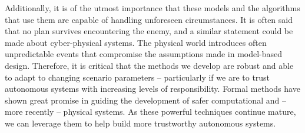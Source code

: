 \documentclass[]{letter}
\begin{document}
Additionally, it is of the utmost importance that these models and the algorithms that use them are capable of handling unforeseen circumstances. It is often said that no plan survives encountering the enemy, and a similar statement could be made about cyber-physical systems. The physical world introduces often unpredictable events that compromise the assumptions made in model-based design. Therefore, it is critical that the methods we develop are robust and able to adapt to changing scenario parameters -- particularly if we are to trust autonomous systems with increasing levels of responsibility. Formal methods have shown great promise in guiding the development of safer computational and -- more recently -- physical systems. As these powerful techniques continue mature, we can leverage them to help build more trustworthy autonomous systems.



\end{document}
